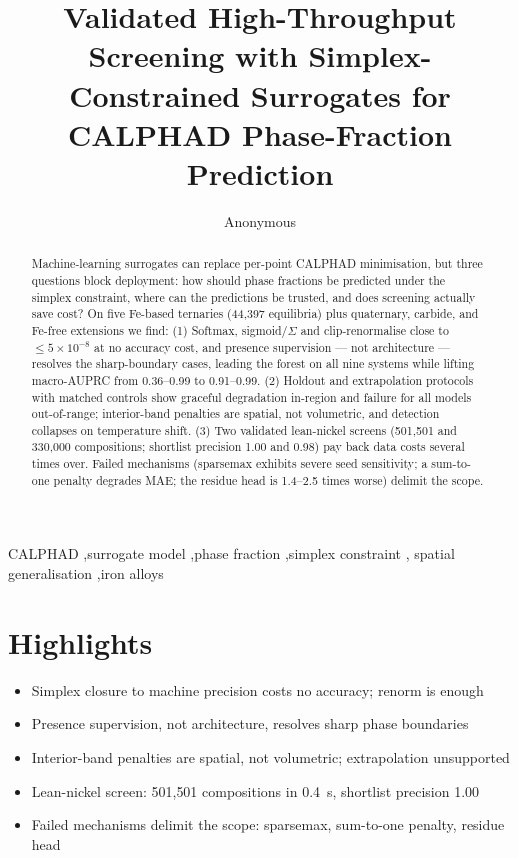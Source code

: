 \documentclass[preprint,12pt,authoryear]{elsarticle}
\begin{document}
\begin{frontmatter}
\setlength{\emergencystretch}{3em}

\title{Validated High-Throughput Screening with Simplex-Constrained
Surrogates for CALPHAD Phase-Fraction Prediction}

\author[a]{Anonymous}
\address[a]{Anonymous}

\begin{abstract}
Machine-learning surrogates can replace per-point CALPHAD minimisation,
but three questions block deployment: how should phase fractions be
predicted under the simplex constraint, where can the predictions be
trusted, and does screening actually save cost? On five Fe-based
ternaries (44{,}397 equilibria) plus quaternary, carbide, and Fe-free
extensions we find: (1) Softmax, sigmoid/$\Sigma$ and clip-renormalise close to
$\le 5\times10^{-8}$ at no accuracy cost, and presence supervision ---
not architecture --- resolves the sharp-boundary cases, leading the
forest on all nine systems while lifting macro-AUPRC from 0.36--0.99
to 0.91--0.99. (2) Holdout and extrapolation protocols with matched
controls show graceful degradation in-region and failure for all models
out-of-range; interior-band penalties are spatial, not volumetric,
and detection collapses on temperature shift. (3) Two
validated lean-nickel screens (501{,}501 and 330{,}000 compositions;
shortlist precision 1.00 and 0.98) pay back data costs several times
over. Failed mechanisms (sparsemax exhibits severe seed sensitivity; a
sum-to-one penalty degrades MAE; the residue head is 1.4--2.5 times
worse) delimit the scope.
\end{abstract}

\begin{keyword}
CALPHAD \sep surrogate model \sep phase fraction \sep simplex constraint \sep
spatial generalisation \sep iron alloys
\end{keyword}

\end{frontmatter}

\linenumbers
\setlength{\emergencystretch}{2em}

\section*{Highlights}
\begin{itemize}
\item Simplex closure to machine precision costs no accuracy; renorm is
  enough
\item Presence supervision, not architecture, resolves sharp phase
  boundaries
\item Interior-band penalties are spatial, not volumetric;
  extrapolation unsupported
\item Lean-nickel screen: 501{,}501 compositions in 0.4~s, shortlist
  precision 1.00
\item Failed mechanisms delimit the scope: sparsemax, sum-to-one
  penalty, residue head
\end{itemize}
\end{document}
